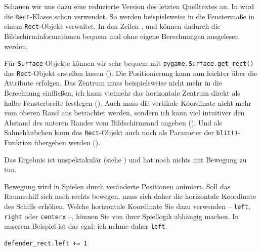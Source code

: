 Schauen wir uns dazu eine reduzierte Version des letzten Quelltextes an. In  wird die \texttt{Rect}-Klasse schon verwendet. So werden beispielsweise in  die Fenstermaße in einem \texttt{Rect}-Objekt verwaltet. In den Zeilen ,  und  können dadurch die Bildschirminformationen bequem und ohne eigene Berechnungen ausgelesen werden.


Für \texttt{Surface}-Objekte können wir sehr bequem mit \texttt{pygame.Surface.get\_rect()} das \texttt{Rect}-Objekt erstellen lassen (). Die Positionierung kann nun leichter über die Attribute erfolgen. Das Zentrum muss beispielsweise nicht mehr in die Berechnung einfließen, ich kann vielmehr das horizontale Zentrum direkt als halbe Fensterbreite festlegen (). Auch muss die vertikale Koordinate nicht mehr vom oberen Rand aus betrachtet werden, sondern ich kann viel intuitiver den Abstand des unteren Randes vom Bildschirmrand angeben (). Und als Sahnehäubchen kann das \texttt{Rect}-Objekt auch noch als Parameter der \texttt{blit()}-Funktion übergeben werden ().


Das Ergebnis ist unspektakulär (siehe ) und hat noch nichts mit Bewegung zu tun.

Bewegung wird in Spielen durch veränderte Positionen animiert. Soll das Raumschiff sich nach rechts bewegen, muss sich daher die horizontale Koordinate des Schiffs erhöhen. Welche horizontale Koordinate Sie dazu verwenden -- \texttt{left}, \texttt{right} oder \texttt{centerx} --, können Sie von ihrer Spiellogik abhängig machen. In unserem Beispiel ist das egal; ich nehme daher \texttt{left}.

\lstset{firstnumber=29}
\begin{lstlisting}
defender_rect.left += 1
\end{lstlisting}

